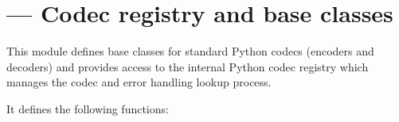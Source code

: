 \section{ ---
         Codec registry and base classes}




This module defines base classes for standard Python codecs (encoders
and decoders) and provides access to the internal Python codec
registry which manages the codec and error handling lookup process.

It defines the following functions:

